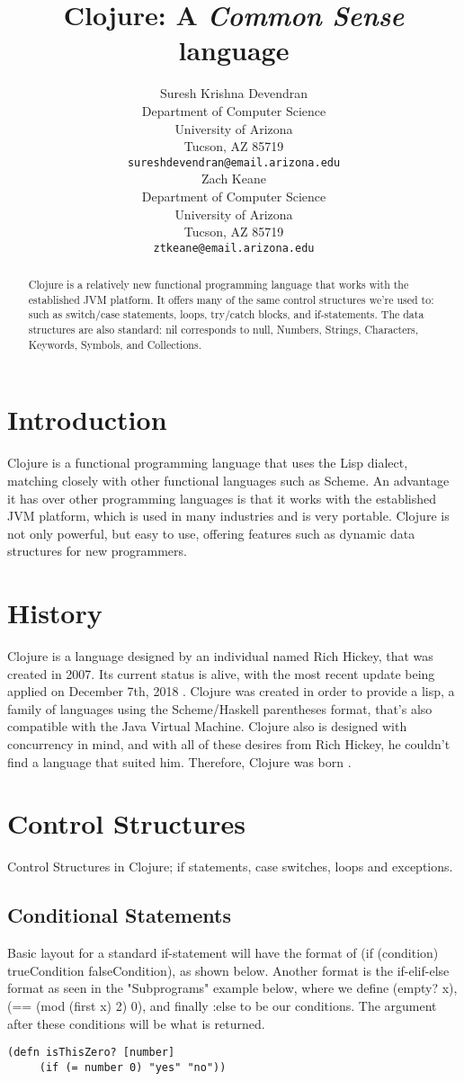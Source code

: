 \documentclass{article}
\title{Clojure: A \emph{Common Sense} language }
\author{
  Suresh Krishna Devendran\\
  Department of Computer Science\\
  University of Arizona\\
  Tucson, AZ 85719 \\
  \texttt{sureshdevendran@email.arizona.edu} \\
   \And
 Zach Keane\\
  Department of Computer Science\\
  University of Arizona\\
  Tucson, AZ 85719\\
  \texttt{ztkeane@email.arizona.edu} \\
}
\begin{document}
\maketitle

\begin{abstract}
Clojure is a relatively new functional programming language that works with the established JVM platform. It offers many of the same control structures we're used to: such as switch/case statements, loops, try/catch blocks, and if-statements. The data structures are also standard: nil corresponds to null, Numbers, Strings, Characters, Keywords, Symbols, and Collections.
\end{abstract}

\section{Introduction}
Clojure is a functional programming language that uses the Lisp dialect, matching closely with other functional languages such as Scheme. An advantage it has over other programming languages is that it works with the established JVM platform, which is used in many industries and is very portable. Clojure is not only powerful, but easy to use, offering features such as dynamic data structures for new programmers.


\section{History}
Clojure is a language designed by an individual named Rich Hickey, that was created in 2007. Its current status is alive, with the most recent update being applied on December 7th, 2018 . Clojure was created in order to provide a lisp, a family of languages using the Scheme/Haskell parentheses format, that’s also compatible with the Java Virtual Machine. Clojure also is designed with concurrency in mind, and with all of these desires from Rich Hickey, he couldn’t find a language that suited him. Therefore, Clojure was born .

\section{Control Structures}
Control Structures in Clojure; if statements, case switches, loops and exceptions.
\subsection{Conditional Statements}
Basic layout for a standard if-statement will have the format of (if (condition) trueCondition falseCondition), as shown below. Another format is the if-elif-else format as seen in the "Subprograms" example below, where we define (empty? x), (== (mod (first x) 2) 0), and finally :else to be our conditions. The argument after these conditions will be what is returned.
\begin{lstlisting}
(defn isThisZero? [number]
     (if (= number 0) "yes" "no"))
\end{lstlisting}
\end{document}
